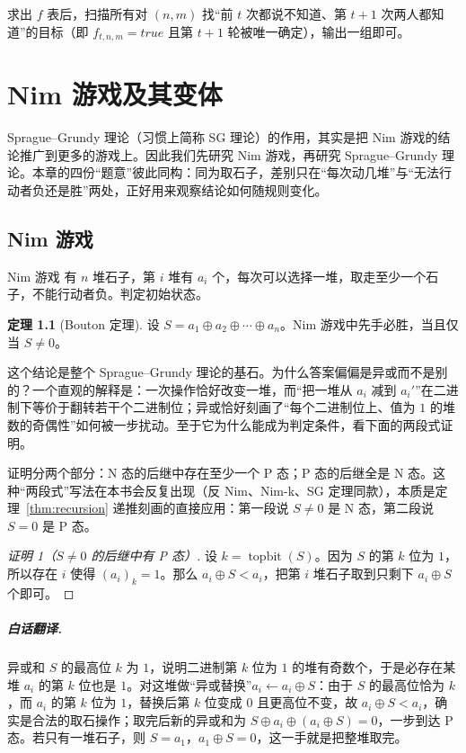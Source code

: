 \documentclass[UTF8,a4paper,11pt,oneside,openany,fontset=fandol]{ctexbook}
\theoremstyle{definition}
\newtheorem{theorem}[definition]{定理}
\newcommand{\topbit}{\operatorname{topbit}}
\begin{document}
求出 $f$ 表后，扫描所有对 $(n,m)$ 找“前 $t$ 次都说不知道、第 $t+1$ 次两人都知道”的目标（即 $f_{t,n,m}=true$ 且第 $t+1$ 轮被唯一确定），输出一组即可。

\chapter{Nim 游戏及其变体}
Sprague--Grundy 理论（习惯上简称 SG 理论）的作用，其实是把 Nim 游戏的结论推广到更多的游戏上。因此我们先研究 Nim 游戏，再研究 Sprague--Grundy 理论。本章的四份“题意”彼此同构：同为取石子，差别只在“每次动几堆”与“无法行动者负还是胜”两处，正好用来观察结论如何随规则变化。

\section{Nim 游戏}
\begin{problem}{Nim 游戏}
有 $n$ 堆石子，第 $i$ 堆有 $a_i$ 个，每次可以选择一堆，取走至少一个石子，不能行动者负。判定初始状态。
\end{problem}

\begin{theorem}[Bouton 定理]\label{thm:bouton}
设 $S=a_1\oplus a_2\oplus\cdots\oplus a_n$。Nim 游戏中先手必胜，当且仅当 $S\ne0$。
\end{theorem}

这个结论是整个 Sprague--Grundy 理论的基石。为什么答案偏偏是异或而不是别的？一个直观的解释是：一次操作恰好改变一堆，而“把一堆从 $a_i$ 减到 $a_i'$”在二进制下等价于翻转若干个二进制位；异或恰好刻画了“每个二进制位上、值为 $1$ 的堆数的奇偶性”如何被一步扰动。至于它为什么能成为判定条件，看下面的两段式证明。

证明分两个部分：N 态的后继中存在至少一个 P 态；P 态的后继全是 N 态。这种“两段式”写法在本书会反复出现（反 Nim、Nim-k、SG 定理同款），本质是定理~\ref{thm:recursion} 递推刻画的直接应用：第一段说 $S\ne0$ 是 N 态，第二段说 $S=0$ 是 P 态。

\begin{proof}[证明 1（$S\ne0$ 的后继中有 P 态）]
设 $k=\topbit(S)$。因为 $S$ 的第 $k$ 位为 $1$，所以存在 $i$ 使得 $(a_i)_k=1$。那么 $a_i\oplus S<a_i$，把第 $i$ 堆石子取到只剩下 $a_i\oplus S$ 个即可。
\end{proof}

\paragraph{白话翻译.} 异或和 $S$ 的最高位 $k$ 为 $1$，说明二进制第 $k$ 位为 $1$ 的堆有奇数个，于是必存在某堆 $a_i$ 的第 $k$ 位也是 $1$。对这堆做“异或替换”$a_i\leftarrow a_i\oplus S$：由于 $S$ 的最高位恰为 $k$，而 $a_i$ 的第 $k$ 位为 $1$，替换后第 $k$ 位变成 $0$ 且更高位不变，故 $a_i\oplus S<a_i$，确实是合法的取石操作；取完后新的异或和为 $S\oplus a_i\oplus(a_i\oplus S)=0$，一步到达 P 态。若只有一堆石子，则 $S=a_1$，$a_1\oplus S=0$，这一手就是把整堆取完。
\end{document}
